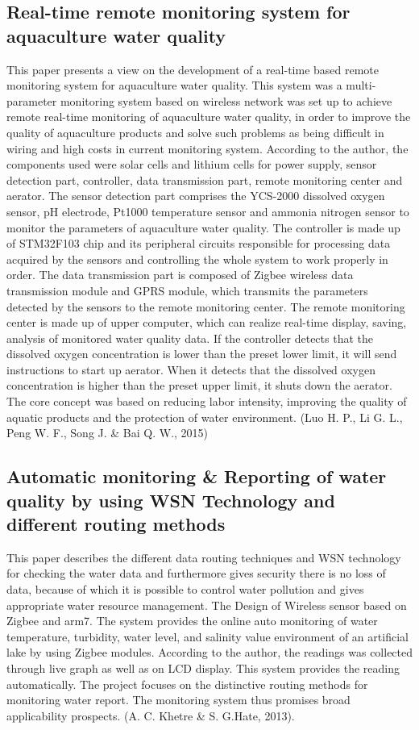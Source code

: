 \documentclass[12pt]{article}
\begin{document}
			\subsection*{Real-time remote monitoring system for aquaculture water quality}
			This paper presents a view on the development of a real-time based remote monitoring system for aquaculture water quality. This system was a multi-parameter monitoring system based on wireless network was set up to achieve remote real-time monitoring of aquaculture water quality, in order to improve the quality of aquaculture products and solve such problems as being difficult in wiring and high costs in current monitoring system. According to the author, the components used were solar cells and lithium cells for power supply, sensor detection part, controller, data transmission part, remote monitoring center and aerator.  The sensor detection part comprises the YCS-2000 dissolved oxygen sensor, pH electrode, Pt1000 temperature sensor and ammonia nitrogen sensor to monitor the parameters of aquaculture water quality.  The controller is made up of STM32F103 chip and its peripheral circuits responsible for processing data acquired by the sensors and controlling the whole system to work properly in order.  The data transmission part is composed of Zigbee wireless data transmission module and GPRS module, which transmits the parameters detected by the sensors to the remote monitoring center.  The remote monitoring center is made up of upper computer, which can realize real-time display, saving, analysis of monitored water quality data.  If the controller detects that the dissolved oxygen concentration is lower than the preset lower limit, it will send instructions to start up aerator.  When it detects that the dissolved oxygen concentration is higher than the preset upper limit, it shuts down the aerator. The core concept was based on reducing labor intensity, improving the quality of aquatic products and the protection of water environment. (Luo H. P., Li G. L., Peng W. F., Song J. \& Bai Q. W., 2015)
			
				\subsection*{Automatic monitoring \& Reporting of water quality by using WSN Technology and different routing methods}
				This paper describes the different data routing techniques and WSN technology for checking the water data and furthermore gives security there is no loss of data, because of which it is possible to control water pollution and gives appropriate water resource management. The Design of Wireless sensor based on Zigbee and arm7. The system provides the online auto monitoring of water temperature, turbidity, water level, and salinity value environment of an artificial lake by using Zigbee modules. According to the author, the readings was collected through live graph as well as on LCD display. This system provides the reading automatically. The project focuses on the distinctive routing methods for monitoring water report. The monitoring system thus promises broad applicability prospects. (A. C. Khetre \& S. G.Hate, 2013).
				
\end{document}
